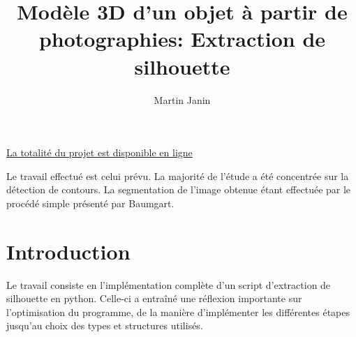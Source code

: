\documentclass{article}
\author{Martin Janin}
\title{Modèle 3D d'un objet à partir de photographies: Extraction de silhouette}
\begin{document}
\maketitle

\centerline{\href{https://github.com/Involture/fuuusion}{La totalité du projet est disponible en ligne}}

\bigskip
\bigskip

Le travail effectué est celui prévu. La majorité de l'étude a été concentrée sur la détection de contours. La segmentation de l'image obtenue étant effectuée par le procédé simple présenté par Baumgart.

\noindent\makebox[\linewidth]{\rule{\textwidth}{0.4pt}}
\vspace{-0.8cm}
\tableofcontents
\noindent\makebox[\linewidth]{\rule{\textwidth}{0.4pt}}

\bigskip
\bigskip

\section{Introduction}

Le travail consiste en l'implémentation complète d'un script d'extraction de silhouette en python. Celle-ci a entraîné une réflexion importante sur l'optimisation du programme, de la manière d'implémenter les différentes étapes jusqu'au choix des types et structures utilisés.
\end{document}
